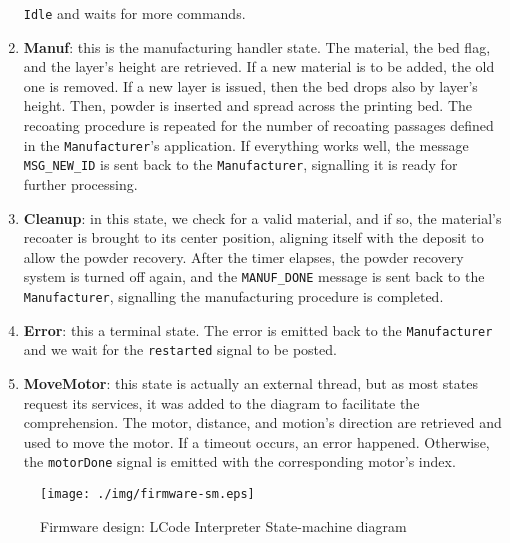 \begin{enumerate}
  \texttt{Idle} and waits for more commands.
\item \textbf{Manuf}: this is the manufacturing handler state. The material, the
  bed flag, and the layer's height are retrieved.
  If a new material is to be added, the old one is removed. If a new layer is
  issued, then the bed drops also by layer's height. Then, powder is inserted
  and spread across the printing bed. The recoating procedure is repeated for
  the number of recoating passages defined in the \texttt{Manufacturer}'s
  application. If everything works well, the message \texttt{MSG\_NEW\_ID} is sent
  back to the \texttt{Manufacturer}, signalling it is ready for further
  processing.
\item \textbf{Cleanup}: in this state, we check for a valid material, and if so,
  the material's recoater is brought to its center position, aligning itself
  with the deposit to allow the powder recovery. After the timer elapses, the
  powder recovery system is turned off again, and the \texttt{MANUF\_DONE}
  message is sent back to the \texttt{Manufacturer}, signalling the
  manufacturing procedure is completed.
\item \textbf{Error}: this a terminal state. The error is emitted back to the
  \texttt{Manufacturer} and we wait for the \texttt{restarted} signal to be posted.
\item \textbf{MoveMotor}: this state is actually an external thread, but as most
  states request its services, it was added to the diagram to facilitate the
  comprehension. The motor, distance, and motion's direction are retrieved and
  used to move the motor. If a timeout occurs, an error happened. Otherwise, the
  \texttt{motorDone} signal is emitted with the corresponding motor's index.
\end{enumerate}

\begin{figure}[!hbt]
  \centering
    \texttt{[image: ./img/firmware-sm.eps]}
  \caption{Firmware design: LCode Interpreter State-machine diagram}\label{fig:firmware-sm}
\end{figure}

